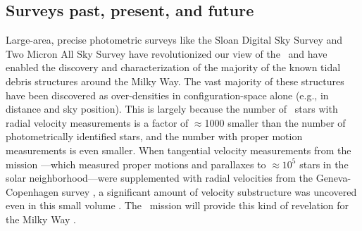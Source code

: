 \subsection{Surveys past, present, and future}

Large-area, precise photometric surveys like the Sloan Digital Sky Survey
\citep[SDSS;][]{york00} and Two Micron All Sky Survey
\citep[2MASS;][]{skrutskie06} have revolutionized our view of the \mwhalo\ and
have enabled the discovery and characterization of the majority of the known
tidal debris structures around the Milky Way. The vast majority of these
structures have been discovered as over-densities in configuration-space alone
(e.g., in distance and sky position). This is largely because the number of
\mwhalo\ stars with radial velocity measurements is a factor of $\approx$1000
smaller than the number of photometrically identified stars, and the number with
proper motion measurements is even smaller. When tangential velocity
measurements from the  mission \citep{perryman97}---which
measured proper motions and parallaxes to $\approx$$10^5$ stars in the solar
neighborhood---were supplemented with radial velocities from the
Geneva-Copenhagen survey \citep{nordstrom04}, a significant amount of velocity
substructure was uncovered even in this small volume \citep[e.g.,][]{bovy09,
minchev10}. The \gaia\ mission will provide this kind of revelation for the
Milky Way \mwhalo.

